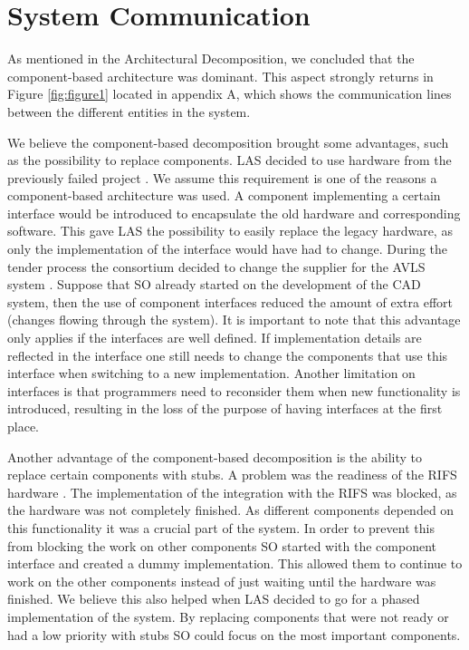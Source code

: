 \section*{System Communication}

As mentioned in the Architectural Decomposition, we concluded that the component-based architecture was dominant.
This aspect strongly returns in Figure \ref{fig:figure1} located in appendix A,
which shows the communication lines between the different entities in the system.

We believe the component-based decomposition brought some advantages, such as the possibility to replace components.
LAS decided to use hardware from the previously failed project \autocite[8]{kramer1996succeedings}.
We assume this requirement is one of the reasons a component-based architecture was used.
A component implementing a certain interface would be introduced to encapsulate the old hardware and corresponding software.
This gave LAS the possibility to easily replace the legacy hardware, as only the implementation of the interface would have had to change.
During the tender process the consortium decided to change the supplier for the AVLS system \autocite[3073]{officialreport}.
Suppose that SO already started on the development of the CAD system, then the use of component interfaces reduced the amount of extra effort (changes flowing through the system).
It is important to note that this advantage only applies if the interfaces are well defined.
If implementation details are reflected in the interface one still needs to change the components that use this interface when switching to a new implementation.
Another limitation on interfaces is that programmers need to reconsider them when new functionality is introduced,
resulting in the loss of the purpose of having interfaces at the first place.

Another advantage of the component-based decomposition is the ability to replace certain components with stubs.
A problem was the readiness of the RIFS hardware \autocite[3074]{officialreport}.
The implementation of the integration with the RIFS was blocked, as the hardware was not completely finished.
As different components depended on this functionality it was a crucial part of the system.
In order to prevent this from blocking the work on other components SO started with the component interface and created a dummy implementation.
This allowed them to continue to work on the other components instead of just waiting until the hardware was finished.
We believe this also helped when LAS decided to go for a phased implementation of the system.
By replacing components that were not ready or had a low priority with stubs SO could focus on the most important components.

